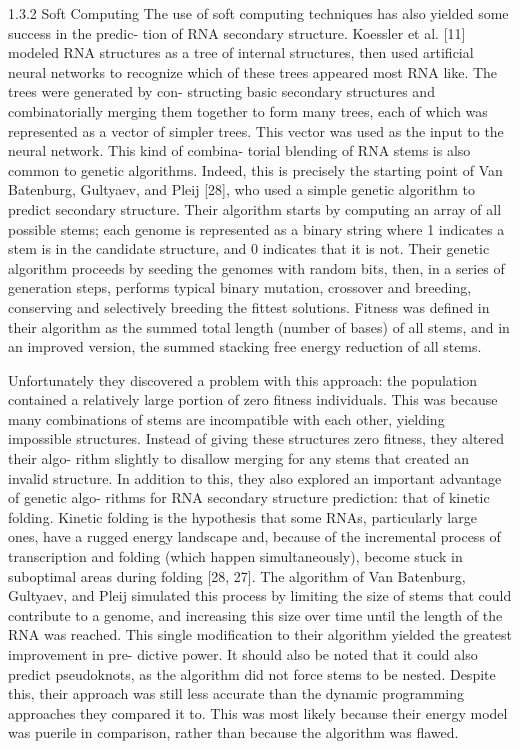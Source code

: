 \documentclass{cshonours}
\begin{document}
1.3.2 Soft Computing
The use of soft computing techniques has also yielded some success in the predic-
tion of RNA secondary structure. Koessler et al. [11] modeled RNA structures
as a tree of internal structures, then used artificial neural networks to recognize
which of these trees appeared most RNA like. The trees were generated by con-
structing basic secondary structures and combinatorially merging them together
to form many trees, each of which was represented as a vector of simpler trees.
This vector was used as the input to the neural network. This kind of combina-
torial blending of RNA stems is also common to genetic algorithms. Indeed, this
is precisely the starting point of Van Batenburg, Gultyaev, and Pleij [28], who
used a simple genetic algorithm to predict secondary structure. Their algorithm
starts by computing an array of all possible stems; each genome is represented
as a binary string where 1 indicates a stem is in the candidate structure, and 0
indicates that it is not. Their genetic algorithm proceeds by seeding the genomes
with random bits, then, in a series of generation steps, performs typical binary
mutation, crossover and breeding, conserving and selectively breeding the fittest
solutions. Fitness was defined in their algorithm as the summed total length
(number of bases) of all stems, and in an improved version, the summed stacking
free energy reduction of all stems.

Unfortunately they discovered a problem with this approach: the population
contained a relatively large portion of zero fitness individuals. This was because
many combinations of stems are incompatible with each other, yielding impossible
structures. Instead of giving these structures zero fitness, they altered their algo-
rithm slightly to disallow merging for any stems that created an invalid structure.
In addition to this, they also explored an important advantage of genetic algo-
rithms for RNA secondary structure prediction: that of kinetic folding. Kinetic
folding is the hypothesis that some RNAs, particularly large ones, have a rugged
energy landscape and, because of the incremental process of transcription and
folding (which happen simultaneously), become stuck in suboptimal areas during
folding [28, 27]. The algorithm of Van Batenburg, Gultyaev, and Pleij simulated
this process by limiting the size of stems that could contribute to a genome, and
increasing this size over time until the length of the RNA was reached. This
single modification to their algorithm yielded the greatest improvement in pre-
dictive power. It should also be noted that it could also predict pseudoknots, as
the algorithm did not force stems to be nested. Despite this, their approach was
still less accurate than the dynamic programming approaches they compared it
to. This was most likely because their energy model was puerile in comparison,
rather than because the algorithm was flawed.
\end{document}
